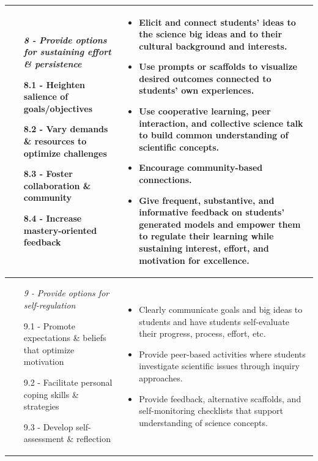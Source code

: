 \documentclass[11.5pt]{sig-alternate}
\begin{document}
\begin{large}
\begin{table}
\begin{tabular}{ll}
\begin{enumerate}
    \item[\textit{8 - }] \textit{Provide options for sustaining effort \& persistence}
    \item[8.1 - ] Heighten salience of goals/objectives
    \item[8.2 - ] Vary demands \& resources to optimize challenges
    \item[8.3 - ] Foster collaboration \& community
    \item[8.4 - ] Increase mastery-oriented feedback
\end{enumerate}
&
\begin{itemize}
    \item Elicit and connect students’ ideas to the science big ideas and to their cultural background and interests.
    \item Use prompts or scaffolds to visualize desired outcomes connected to students' own experiences.
    \item Use cooperative learning, peer interaction, and collective science talk to build common understanding of scientific concepts.
    \item Encourage community-based connections.
    \item Give frequent, substantive, and informative feedback on students’ generated models and empower them to regulate their learning while sustaining interest, effort, and motivation for excellence.
\end{itemize} \\ \hline
\begin{enumerate}
    \item[\textit{9 - }] \textit{Provide options for self-regulation}
    \item[9.1 - ] Promote expectations \& beliefs that optimize motivation
    \item[9.2 - ] Facilitate personal coping skills \& strategies
    \item[9.3 - ] Develop self-assessment \& reflection
\end{enumerate}
&
\begin{itemize}
    \item Clearly communicate goals and big ideas to students and have students self-evaluate their progress, process, effort, etc.
    \item Provide peer-based activities where students investigate scientific issues through inquiry approaches.
    \item Provide feedback, alternative scaffolds, and self-monitoring checklists that support understanding of science concepts.
\end{itemize} \\
\hline
\end{tabular}
\end{table}



\end{large}
\end{document}
